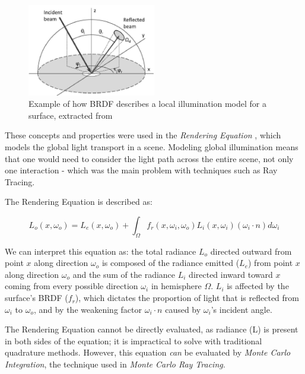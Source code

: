 \begin{figure}[h]
  \centering
  \includegraphics[width=0.5\textwidth,height=\textheight,keepaspectratio]{images/3_theoretical_foundations/brdf.png}
  \caption{Example of how BRDF describes a local illumination model for a surface, extracted from \cite{brdf}}
  \label{fig:brdf}
\end{figure}


These concepts and properties were used in the \textit{Rendering Equation} \cite{Kajiya:1986}, which models the global light transport in a scene. Modeling global illumination means that one would need to consider the light path across the entire scene, not only one interaction - which was the main problem with techniques such as Ray Tracing. 

The Rendering Equation is described as:

$$ L_o (x, \omega_o) = L_e (x, \omega_o) + \int_{\Omega} f_r (x, \omega_i, \omega_o) L_i (x, \omega_i) (\omega_i \cdot n) d\omega_i $$

We can interpret this equation as: the total radiance $L_o$ directed outward from point $x$ along direction $\omega_o$ is composed of the radiance emitted ($L_e$) from point $x$ along direction $\omega_o$ and the sum of the radiance $L_i$ directed inward toward $x$ coming from every possible direction $\omega_i$ in hemisphere $\Omega$. $L_i$ is affected by the surface's BRDF ($f_r$), which dictates the proportion of light that is reflected from $\omega_i$ to $\omega_o$, and by the weakening factor $\omega_i \cdot n$ caused by $\omega_i$'s incident angle. 

The Rendering Equation cannot be directly evaluated, as radiance (L) is present in both sides of the equation; it is impractical to solve with traditional quadrature methods. However, this equation \textit{can} be evaluated by \textit{Monte Carlo Integration}, the technique used in \textit{Monte Carlo Ray Tracing}.

